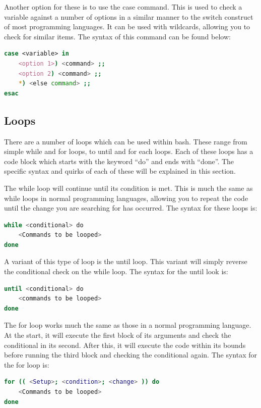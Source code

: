 \documentclass[a4paper,11pt]{report}
\begin{document}
			Another option for these is to use the case command. 
			This is used to check a variable against a number of options in a similar manner to the switch construct of most programming languages. 
			It can be used with wildcards, allowing you to check for similar items. 
			The syntax of this command can be found below:
			\begin{lstlisting}[language=bash,numbers=none]
case <variable> in
	<option 1>) <command> ;;
	<option 2) <command> ;;
	*) <else command> ;;
esac
			\end{lstlisting}
		\subsection{Loops}
			There are a number of loops which can be used within bash. 
			These range from simple while and for loops, to until  and for each loops. 
			Each of these loops has a code block which starts with the keyword ``do'' and ends with ``done''. 
			The specific syntax and quirks of each of these will be explained in this section. 

			The while loop will continue until its condition is met. 
			This is much the same as while loops in normal programming languages, allowing you to repeat the code until the change you are searching for has occurred. 
			The syntax for these loops is:
			\begin{lstlisting}[language=bash,numbers=none]
while <conditional> do
	<Commands to be looped>
done
			\end{lstlisting}
			A variant of this type of loop is the until loop. 
			This variant will simply reverse the conditional check on the while loop. 
			The syntax for the until look is:
			\begin{lstlisting}[language=bash,numbers=none]
until <conditional> do
	<commands to be looped>
done
			\end{lstlisting}

			The for loop works much the same as those in a normal programming language. 
			At the start, it will execute the first block of its arguments and check the conditional in its second. 
			After this, it will execute the code within its bounds before running the third block and checking the conditional again. 
			The syntax for the for loop is:
			\begin{lstlisting}[language=bash,numbers=none]
for (( <Setup>; <condition>; <change> )) do
	<Commands to be looped>
done
			\end{lstlisting}
\end{document}

